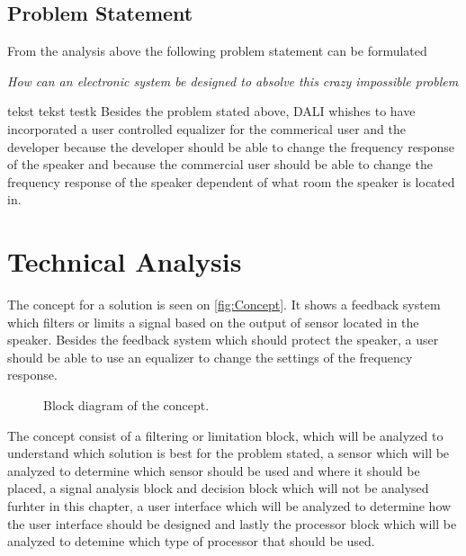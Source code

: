 





%

%

%

\section{Problem Statement}
From the analysis above the following problem statement can be formulated

\begin{center}
\label{ProblemStatement}
\textit{How can an electronic system be designed to absolve this crazy impossible problem}
\end{center}
tekst tekst testk
Besides the problem stated above, DALI whishes to have incorporated a user controlled equalizer for the commerical user and the developer because the developer should be able to change the frequency response of the speaker and because the commercial user should be able to change the frequency response of the speaker dependent of what room the speaker is located in. 
\chapter{Technical Analysis}
The concept for a solution is seen on \autoref{fig:Concept}. It shows a feedback system which filters or limits a signal based on the output of sensor located in the speaker. Besides the feedback system which should protect the speaker, a user should be able to use an equalizer to change the settings of the frequency response.  
\begin{figure}[H]
\centering
{}
\scalebox{0.8}{
}
\caption{Block diagram of the concept.}
\label{fig:Concept}
\end{figure}
The concept consist of a filtering or limitation block, which will be analyzed to understand which solution is best for the problem stated, a sensor which will be analyzed to determine which sensor should be used and where it should be placed, a signal analysis block and decision block which will not be analysed furhter in this chapter, a user interface which will be analyzed to determine how the user interface should be designed and lastly the processor block which will be analyzed to detemine which type of processor that should be used. 

